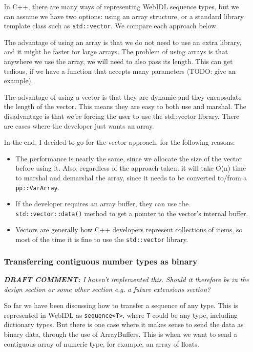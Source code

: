 In C++, there are many ways of representing WebIDL sequence types, but we can assume we have two options: using an array structure, or a standard library template class such as \lstinline{std::vector}. We compare each approach below.

The advantage of using an array is that we do not need to use an extra library, and it might be faster for large arrays. The problem of using arrays is that anywhere we use the array, we will need to also pass its length. This can get tedious, if we have a function that accepts many parameters (TODO: give an example).

The advantage of using a vector is that they are dynamic and they encapsulate the length of the vector. This means they are easy to both use and marshal. The disadvantage is that we're forcing the user to use the std::vector library. There are cases where the developer just wants an array.

In the end, I decided to go for the vector approach, for the following reasons:

\begin{itemize}
	\item The performance is nearly the same, since we allocate the size of the vector before using it. Also, regardless of the approach taken, it will take O(n) time to marshal and demarshal the array, since it needs to be converted to/from a \lstinline{pp::VarArray}.
	\item If the developer requires an array buffer, they can use the \lstinline{std::vector::data()} method to get a pointer to the vector's internal buffer.
	\item Vectors are generally how C++ developers represent collections of items, so most of the time it is fine to use the \lstinline{std::vector} library.
\end{itemize}

\subsubsection{Transferring contiguous number types as binary} %
\label{ssub:transferring_binary}
\emph{\textbf{DRAFT COMMENT:} I haven't implemented this. Should it therefore be in the design section or some other section e.g. a future extensions section?} 


So far we have been discussing how to transfer a sequence of any type. This is represented in WebIDL as \lstinline{sequence<T>}, where \lstinline{T} could be any type, including dictionary types. But there is one case where it makes sense to send the data as binary data, through the use of ArrayBuffers. This is when we want to send a contiguous array of numeric type, for example, an array of floats. 


